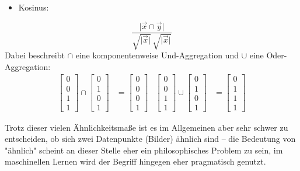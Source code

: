 		\begin{itemize}
			\item Kosinus:
		\end{itemize}
		\begin{equation}
			\frac{\lvert \vec{x} \cap \vec{y} \rvert}{\sqrt{\lvert \vec{x} \rvert} \, \sqrt{\lvert \vec{x} \rvert}}
		\end{equation}
		Dabei beschreibt \( \cap \) eine komponentenweise Und-Aggregation und \( \cup \) eine Oder-Aggregation:
		\begin{align}
			\begin{bmatrix}
				0 \\ 0 \\ 1 \\ 1
			\end{bmatrix}
			\cap
			\begin{bmatrix}
				0 \\ 1 \\ 0 \\ 1
			\end{bmatrix}
			&=
			\begin{bmatrix}
				0 \\ 0 \\ 0 \\ 1
			\end{bmatrix}
			&
			\begin{bmatrix}
				0 \\ 0 \\ 1 \\ 1
			\end{bmatrix}
			\cup
			\begin{bmatrix}
				0 \\ 1 \\ 0 \\ 1
			\end{bmatrix}
			&=
			\begin{bmatrix}
				0 \\ 1 \\ 1 \\ 1
			\end{bmatrix}
		\end{align}

		Trotz dieser vielen Ähnlichkeitsmaße ist es im Allgemeinen aber sehr schwer zu entscheiden, ob sich zwei Datenpunkte (\zB Bilder) ähnlich sind -- die Bedeutung von "ähnlich" scheint an dieser Stelle eher ein philosophisches Problem zu sein, im maschinellen Lernen wird der Begriff hingegen eher pragmatisch genutzt.

